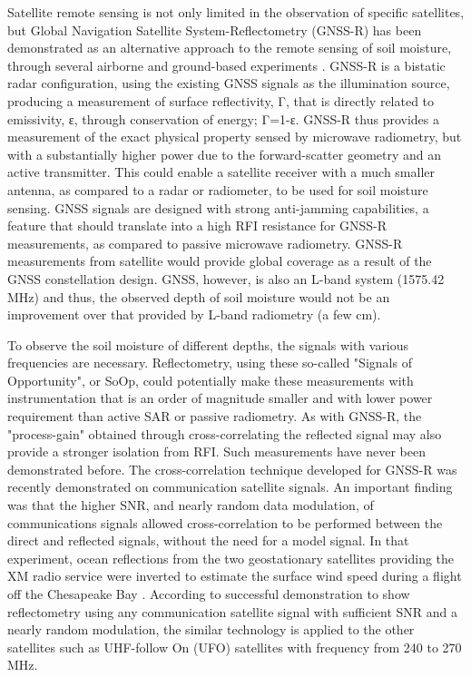 \documentclass[draftcls,onecolumn]{IEEEtran}  %
\begin{document}
Satellite remote sensing is not only limited in the observation of specific satellites, but Global Navigation Satellite System-Reflectometry (GNSS-R) has been demonstrated as an alternative approach to the remote sensing of soil moisture, through several airborne and ground-based experiments \cite{Zavorotny:2010} \cite{Larson:2008}. GNSS-R is a bistatic radar configuration, using the existing GNSS signals as the illumination source, producing a measurement of surface reflectivity, Γ, that is directly related to emissivity, ε, through conservation of energy; Γ=1-ε. GNSS-R thus provides a measurement of the exact physical property sensed by microwave radiometry, but with a substantially higher power due to the forward-scatter geometry and an active transmitter. This could enable a satellite receiver with a much smaller antenna, as compared to a radar or radiometer, to be used for soil moisture sensing. GNSS signals are designed with strong anti-jamming capabilities, a feature that should translate into a high RFI resistance for GNSS-R measurements, as compared to passive microwave radiometry. GNSS-R measurements from satellite would provide global coverage as a result of the GNSS constellation design. GNSS, however, is also an L-band system (1575.42 MHz) and thus, the observed depth of soil moisture would not be an improvement over that provided by L-band radiometry (a few cm).

To observe the soil moisture of different depths, the signals with various frequencies are necessary. Reflectometry, using these so-called "Signals of Opportunity", or SoOp, could potentially make these measurements with instrumentation that is an order of magnitude smaller and with lower power requirement than active SAR or passive radiometry. As with GNSS-R, the "process-gain" obtained through cross-correlating the reflected signal may also provide a stronger isolation from RFI. Such measurements have never been demonstrated before. The cross-correlation technique developed for GNSS-R was recently demonstrated on communication satellite signals. An important finding was that the higher SNR, and nearly random data modulation, of communications signals allowed cross-correlation to be performed between the direct and reflected signals, without the need for a model signal. In that experiment, ocean reflections from the two geostationary satellites providing the XM radio service were inverted to estimate the surface wind speed during a flight off the Chesapeake Bay \cite{Shah:2011}. According to successful demonstration to show reflectometry using any communication satellite signal with sufficient SNR and a nearly random modulation, the similar technology is applied to the other satellites such as UHF-follow On (UFO) satellites with frequency from 240 to 270 MHz.
\end{document}
